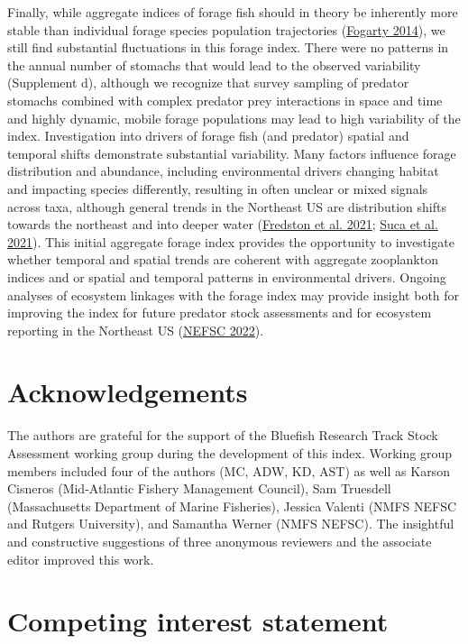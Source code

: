 \documentclass[
]{article}
\begin{document}
Finally, while aggregate indices of forage fish should in theory be inherently more stable than individual forage species population trajectories (\protect\hyperlink{ref-fogarty_art_2014}{Fogarty 2014}), we still find substantial fluctuations in this forage index. There were no patterns in the annual number of stomachs that would lead to the observed variability (Supplement d), although we recognize that survey sampling of predator stomachs combined with complex predator prey interactions in space and time and highly dynamic, mobile forage populations may lead to high variability of the index. Investigation into drivers of forage fish (and predator) spatial and temporal shifts demonstrate substantial variability. Many factors influence forage distribution and abundance, including environmental drivers changing habitat and impacting species differently, resulting in often unclear or mixed signals across taxa, although general trends in the Northeast US are distribution shifts towards the northeast and into deeper water (\protect\hyperlink{ref-fredston_range_2021}{Fredston et al. 2021}; \protect\hyperlink{ref-suca_environmental_2021}{Suca et al. 2021}). This initial aggregate forage index provides the opportunity to investigate whether temporal and spatial trends are coherent with aggregate zooplankton indices and or spatial and temporal patterns in environmental drivers. Ongoing analyses of ecosystem linkages with the forage index may provide insight both for improving the index for future predator stock assessments and for ecosystem reporting in the Northeast US (\protect\hyperlink{ref-nefsc_2022_2022}{NEFSC 2022}).

\hypertarget{acknowledgements}{%
\section{Acknowledgements}\label{acknowledgements}}

The authors are grateful for the support of the Bluefish Research Track Stock Assessment working group during the development of this index. Working group members included four of the authors (MC, ADW, KD, AST) as well as Karson Cisneros (Mid-Atlantic Fishery Management Council), Sam Truesdell (Massachusetts Department of Marine Fisheries), Jessica Valenti (NMFS NEFSC and Rutgers University), and Samantha Werner (NMFS NEFSC). The insightful and constructive suggestions of three anonymous reviewers and the associate editor improved this work.

\hypertarget{competing-interest-statement}{%
\section{Competing interest statement}\label{competing-interest-statement}}
\end{document}
